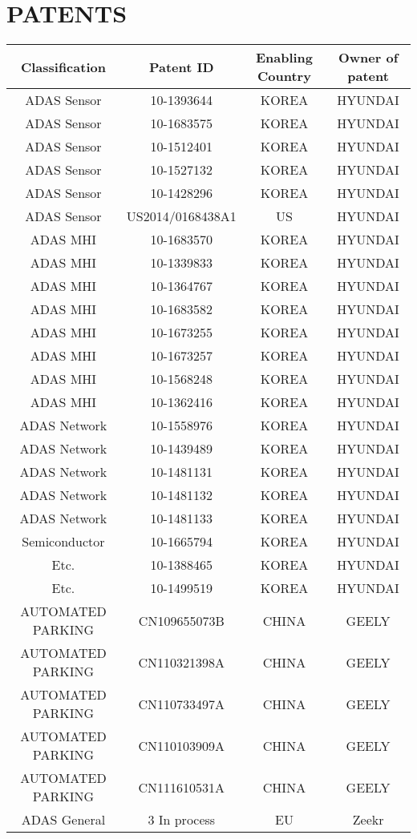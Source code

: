 \documentclass[12pt,a4paper]{article}
\begin{document}
\section{PATENTS}
\begin{tabular}
{c | c | c | c}
Classification & Patent ID & Enabling Country & Owner of patent \\
\hline
ADAS Sensor & 10-1393644 & KOREA & HYUNDAI \\
ADAS Sensor & 10-1683575 & KOREA & HYUNDAI \\
ADAS Sensor & 10-1512401 & KOREA & HYUNDAI \\
ADAS Sensor & 10-1527132 & KOREA & HYUNDAI \\
ADAS Sensor & 10-1428296 & KOREA & HYUNDAI \\
ADAS Sensor & US2014/0168438A1 & US & HYUNDAI \\
ADAS MHI & 10-1683570 & KOREA & HYUNDAI \\
ADAS MHI & 10-1339833 & KOREA & HYUNDAI \\
ADAS MHI & 10-1364767 & KOREA & HYUNDAI \\
ADAS MHI & 10-1683582 & KOREA & HYUNDAI \\
ADAS MHI & 10-1673255 & KOREA & HYUNDAI \\
ADAS MHI & 10-1673257 & KOREA & HYUNDAI \\
ADAS MHI & 10-1568248 & KOREA & HYUNDAI \\
ADAS MHI & 10-1362416 & KOREA & HYUNDAI \\
ADAS Network & 10-1558976 & KOREA & HYUNDAI \\
ADAS Network & 10-1439489 & KOREA & HYUNDAI \\
ADAS Network & 10-1481131 & KOREA & HYUNDAI \\
ADAS Network & 10-1481132 & KOREA & HYUNDAI \\
ADAS Network & 10-1481133 & KOREA & HYUNDAI \\
Semiconductor & 10-1665794 & KOREA & HYUNDAI \\
Etc. & 10-1388465 & KOREA & HYUNDAI \\
Etc. & 10-1499519 & KOREA & HYUNDAI \\
AUTOMATED PARKING & CN109655073B & CHINA & GEELY \\
AUTOMATED PARKING & CN110321398A & CHINA & GEELY \\
AUTOMATED PARKING & CN110733497A & CHINA & GEELY \\
AUTOMATED PARKING & CN110103909A & CHINA & GEELY \\
AUTOMATED PARKING & CN111610531A & CHINA & GEELY \\
ADAS General & 3 In process & EU & Zeekr \\
\end{tabular}
\end{document}
